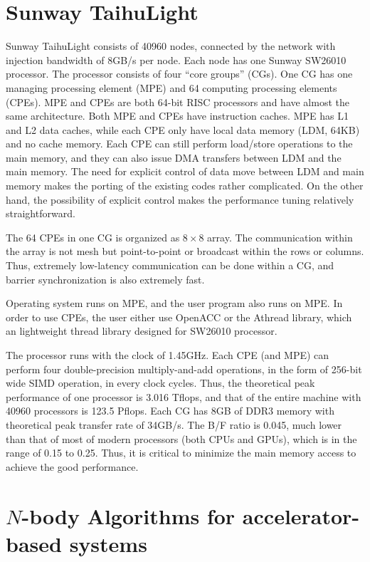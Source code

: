 \documentclass[oribibl]{llncs}
\begin{document}
\section{Sunway TaihuLight}
\label{sec:TaihuLight}

Sunway TaihuLight consists of 40960 nodes, connected by the network
with injection bandwidth of 8GB/s per node. Each node has one Sunway
SW26010 processor.  The processor consists of four ``core groups''
(CGs). One CG has one managing processing element (MPE) and 64
computing processing elements (CPEs).  MPE and CPEs are both 64-bit
RISC processors and have almost the same architecture. Both MPE and
CPEs have instruction caches. MPE has L1 and L2 data caches, while
each CPE only have local data memory (LDM, 64KB) and no cache
memory. Each CPE can still perform load/store operations to the main
memory, and they can also issue DMA transfers between LDM and the main
memory. The need for explicit control of data move between LDM and
main memory makes the porting of the existing codes rather
complicated. On the other hand, the possibility of explicit control
makes the performance tuning relatively straightforward.

The 64 CPEs in one CG is organized as $8\times 8$ array. The
communication within the array is not mesh but point-to-point or
broadcast within the rows or columns. Thus, extremely low-latency
communication can be done within a CG, and barrier synchronization is
also extremely fast.

Operating system runs on MPE, and the user program also runs on
MPE. In order to use CPEs, the user either use OpenACC or the Athread
library, which an lightweight thread library designed for SW26010
processor.

The processor runs with the clock of 1.45GHz. Each CPE (and MPE) can
perform four double-precision multiply-and-add operations, in the form
of 256-bit wide SIMD operation, in every clock cycles. Thus, the
theoretical peak performance of one processor is 3.016 Tflops, and
that of the entire machine with 40960 processors is 123.5 Pflops.
Each CG has 8GB of DDR3 memory with theoretical peak transfer rate of
34GB/s. The B/F ratio is 0.045, much lower than that of most of modern
processors (both CPUs and GPUs), which is in the range of 0.15 to
0.25. Thus, it is critical to minimize the main memory access to
achieve the good performance.

\section{$N$-body Algorithms for accelerator-based systems}
\label{sec:impl0}
\end{document}

